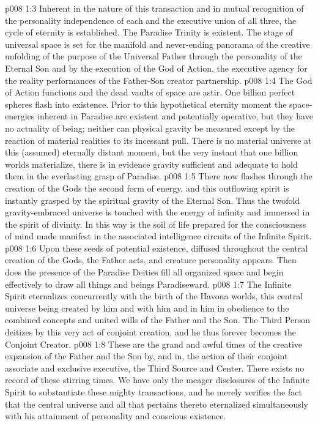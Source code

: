 \vs p008 1:3 Inherent in the nature of this transaction and in mutual recognition of the personality independence of each and the executive union of all three, the cycle of eternity is established. The Paradise Trinity is existent. The stage of universal space is set for the manifold and never\hyp{}ending panorama of the creative unfolding of the purpose of the Universal Father through the personality of the Eternal Son and by the execution of the God of Action, the executive agency for the reality performances of the Father\hyp{}Son creator partnership.
\pc \vs p008 1:4 The God of Action functions and the dead vaults of space are astir. One billion perfect spheres flash into existence. Prior to this hypothetical eternity moment the space\hyp{}energies inherent in Paradise are existent and potentially operative, but they have no actuality of being; neither can physical gravity be measured except by the reaction of material realities to its incessant pull. There is no material universe at this (assumed) eternally distant moment, but the very instant that one billion worlds materialize, there is in evidence gravity sufficient and adequate to hold them in the everlasting grasp of Paradise.
\vs p008 1:5 There now flashes through the creation of the Gods the second form of energy, and this outflowing spirit is instantly grasped by the spiritual gravity of the Eternal Son. Thus the twofold gravity\hyp{}embraced universe is touched with the energy of infinity and immersed in the spirit of divinity. In this way is the soil of life prepared for the consciousness of mind made manifest in the associated intelligence circuits of the Infinite Spirit.
\vs p008 1:6 Upon these seeds of potential existence, diffused throughout the central creation of the Gods, the Father acts, and creature personality appears. Then does the presence of the Paradise Deities fill all organized space and begin effectively to draw all things and beings Paradiseward.
\pc \vs p008 1:7 The Infinite Spirit eternalizes concurrently with the birth of the Havona worlds, this central universe being created by him and with him and in him in obedience to the combined concepts and united wills of the Father and the Son. The Third Person deitizes by this very act of conjoint creation, and he thus forever becomes the Conjoint Creator.
\pc \vs p008 1:8 These are the grand and awful times of the creative expansion of the Father and the Son by, and in, the action of their conjoint associate and exclusive executive, the Third Source and Center. There exists no record of these stirring times. We have only the meager disclosures of the Infinite Spirit to substantiate these mighty transactions, and he merely verifies the fact that the central universe and all that pertains thereto eternalized simultaneously with his attainment of personality and conscious existence.
